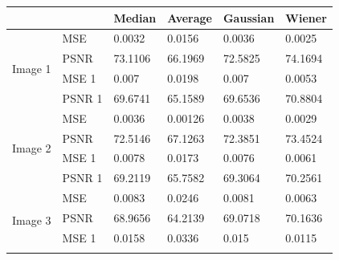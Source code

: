 \begin{center}


\begin{tabular}{|l|l|l|l|l|l|l|l|l|l|}
\hline
\multicolumn{2}{|l|}{}            & \multicolumn{2}{l|}{Median}  & \multicolumn{2}{l|}{Average} & \multicolumn{2}{l|}{Gaussian} & \multicolumn{2}{l|}{Wiener}  \\ \hline
\multirow{4}{*}{Image 1} & MSE    & \multicolumn{2}{l|}{0.0032}  & \multicolumn{2}{l|}{0.0156}  & \multicolumn{2}{l|}{0.0036}   & \multicolumn{2}{l|}{0.0025}  \\ \cline{2-10} 
                         & PSNR   & \multicolumn{2}{l|}{73.1106} & \multicolumn{2}{l|}{66.1969} & \multicolumn{2}{l|}{72.5825}  & \multicolumn{2}{l|}{74.1694} \\ \cline{2-10} 
                         & MSE 1  & \multicolumn{2}{l|}{0.007}   & \multicolumn{2}{l|}{0.0198}  & \multicolumn{2}{l|}{0.007}    & \multicolumn{2}{l|}{0.0053}  \\ \cline{2-10} 
                         & PSNR 1 & \multicolumn{2}{l|}{69.6741} & \multicolumn{2}{l|}{65.1589} & \multicolumn{2}{l|}{69.6536}  & \multicolumn{2}{l|}{70.8804} \\ \hline
\multirow{4}{*}{Image 2} & MSE    & \multicolumn{2}{l|}{0.0036}  & \multicolumn{2}{l|}{0.00126} & \multicolumn{2}{l|}{0.0038}   & \multicolumn{2}{l|}{0.0029}  \\ \cline{2-10} 
                         & PSNR   & \multicolumn{2}{l|}{72.5146} & \multicolumn{2}{l|}{67.1263} & \multicolumn{2}{l|}{72.3851}  & \multicolumn{2}{l|}{73.4524} \\ \cline{2-10} 
                         & MSE 1  & \multicolumn{2}{l|}{0.0078}  & \multicolumn{2}{l|}{0.0173}  & \multicolumn{2}{l|}{0.0076}   & \multicolumn{2}{l|}{0.0061}  \\ \cline{2-10} 
                         & PSNR 1 & \multicolumn{2}{l|}{69.2119} & \multicolumn{2}{l|}{65.7582} & \multicolumn{2}{l|}{69.3064}  & \multicolumn{2}{l|}{70.2561} \\ \hline
\multirow{4}{*}{Image 3} & MSE    & \multicolumn{2}{l|}{0.0083}  & \multicolumn{2}{l|}{0.0246}  & \multicolumn{2}{l|}{0.0081}   & \multicolumn{2}{l|}{0.0063}  \\ \cline{2-10} 
                         & PSNR   & \multicolumn{2}{l|}{68.9656} & \multicolumn{2}{l|}{64.2139} & \multicolumn{2}{l|}{69.0718}  & \multicolumn{2}{l|}{70.1636} \\ \cline{2-10} 
                         & MSE 1  & \multicolumn{2}{l|}{0.0158}  & \multicolumn{2}{l|}{0.0336}  & \multicolumn{2}{l|}{0.015}    & \multicolumn{2}{l|}{0.0115}  \\ \cline{2-10} 

\end{tabular}
\end{center}
